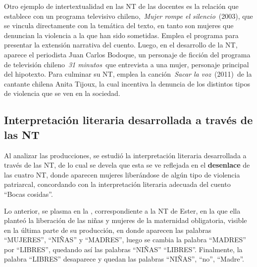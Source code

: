 \documentclass[spanish]{textolivre}
\begin{document}
Otro ejemplo de intertextualidad en las NT de las docentes es la relación que establece con un programa televisivo chileno, \textit{Mujer rompe el silencio} (2003), que se vincula directamente con la temática del texto, en tanto son mujeres que denuncian la violencia a la que han sido sometidas. Emplea el programa para presentar la extensión narrativa del cuento. Luego, en el desarrollo de la NT, aparece el periodista Juan Carlos Bodoque, un personaje de ficción del programa de televisión chileno \textit{31 minutos} que entrevista a una mujer, personaje principal del hipotexto. Para culminar su NT, emplea la canción \textit{Sacar la voz} (2011) de la cantante chilena Anita Tijoux, la cual incentiva la denuncia de los distintos tipos de violencia que se ven en la sociedad. 

\subsection{Interpretación literaria desarrollada a través de las NT}\label{sec-secoes}
Al analizar las producciones, se estudió la interpretación literaria desarrollada a través de las NT, de lo cual se devela que esta se ve reflejada en el \textbf{desenlace} de las cuatro NT, donde aparecen mujeres liberándose de algún tipo de violencia patriarcal, concordando con la interpretación literaria adecuada del cuento “Bocas cosidas”. 

Lo anterior, se plasma en la , correspondiente a la NT de Ester, en la que ella planteó la liberación de las niñas y mujeres de la maternidad obligatoria, visible en la última parte de su producción, en donde aparecen las palabras “MUJERES”, “NIÑAS” y “MADRES”, luego se cambia la palabra “MADRES” por “LIBRES”, quedando así las palabras “NIÑAS” “LIBRES”. Finalmente, la palabra “LIBRES” desaparece y quedan las palabras “NIÑAS”, “no”, “Madre”.
\end{document}
